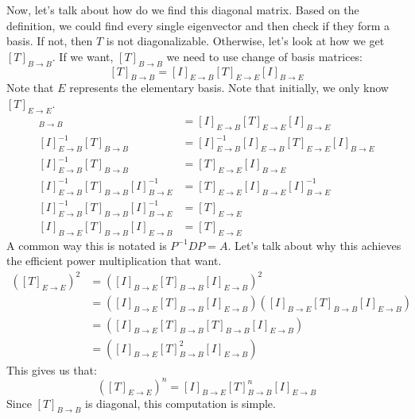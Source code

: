 Now, let's talk about how do we find this diagonal matrix. Based on the definition, we could find every single eigenvector and then check if they form a basis. If not, then $T$ is not diagonalizable. Otherwise, let's look at how we get $[T]_{B\to B}$. If we want, $[T]_{B\to B}$ we need to use change of basis matrices:
$$[T]_{B\to B}=[I]_{E\to B}[T]_{E\to E}[I]_{B\to E}$$
Note that $E$ represents the elementary basis. Note that initially, we only know $[T]_{E\to E}$.
\begin{align*}
    [T]_{B\to B}&=[I]_{E\to B}[T]_{E\to E}[I]_{B\to E}\\
    [I]_{E\to B}^{-1}[T]_{B\to B}&=[I]_{E\to B}^{-1}[I]_{E\to B}[T]_{E\to E}[I]_{B\to E}\\
    [I]_{E\to B}^{-1}[T]_{B\to B}&=[T]_{E\to E}[I]_{B\to E}\\
    [I]_{E\to B}^{-1}[T]_{B\to B}[I]_{B\to E}^{-1}&=[T]_{E\to E}[I]_{B\to E}[I]_{B\to E}^{-1}\\
    [I]_{E\to B}^{-1}[T]_{B\to B}[I]_{B\to E}^{-1}&=[T]_{E\to E}\\
    [I]_{B\to E}[T]_{B\to B}[I]_{E\to B}&=[T]_{E\to E}
\end{align*}
A common way this is notated is $P^{-1}DP=A$. Let's talk about why this achieves the efficient power multiplication that want.
\begin{align*}
    ([T]_{E\to E})^2&=([I]_{B\to E}[T]_{B\to B}[I]_{E\to B})^2\\
    &=([I]_{B\to E}[T]_{B\to B}[I]_{E\to B})([I]_{B\to E}[T]_{B\to B}[I]_{E\to B})\\
    &=([I]_{B\to E}[T]_{B\to B}[T]_{B\to B}[I]_{E\to B})\\
    &=([I]_{B\to E}[T]_{B\to B}^2[I]_{E\to B})
\end{align*}
This gives us that:
$$([T]_{E\to E})^n=[I]_{B\to E}[T]_{B\to B}^n[I]_{E\to B}$$
Since $[T]_{B\to B}$ is diagonal, this computation is simple.
